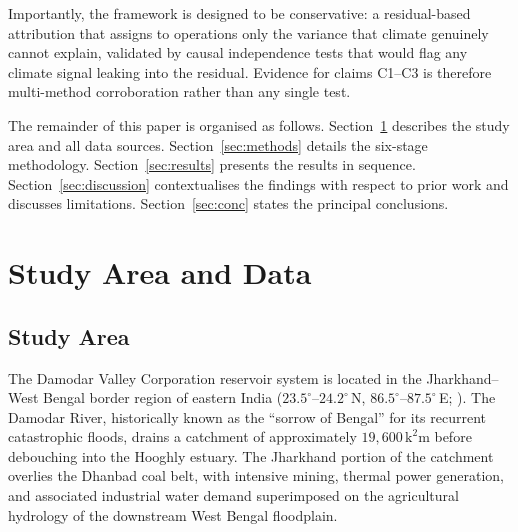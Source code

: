 \documentclass[preprint,12pt,authoryear]{elsarticle}
\begin{document}
Importantly, the framework is designed to be conservative: a residual-based
attribution that assigns to operations only the variance that climate
genuinely cannot explain, validated by causal independence tests that would
flag any climate signal leaking into the residual. Evidence for claims C1--C3
is therefore multi-method corroboration rather than any single test.

The remainder of this paper is organised as follows. Section~\ref{sec:data}
describes the study area and all data sources. Section~\ref{sec:methods}
details the six-stage methodology. Section~\ref{sec:results} presents the
results in sequence. Section~\ref{sec:discussion} contextualises the findings
with respect to prior work and discusses limitations. Section~\ref{sec:conc}
states the principal conclusions.

\section{Study Area and Data}
\label{sec:data}

\subsection{Study Area}
\label{sec:study_area}

The Damodar Valley Corporation reservoir system is located in the
Jharkhand--West Bengal border region of eastern India
($23.5^\circ$--$24.2^\circ$\,N, $86.5^\circ$--$87.5^\circ$\,E;
). The Damodar River, historically known as the ``sorrow
of Bengal'' for its recurrent catastrophic floods, drains a catchment of
approximately $19{,}600\,\si{\square\kilo\metre}$ before debouching into
the Hooghly estuary. The Jharkhand portion of the catchment overlies the
Dhanbad coal belt, with intensive mining, thermal power generation, and
associated industrial water demand superimposed on the agricultural hydrology
of the downstream West Bengal floodplain.
\end{document}
